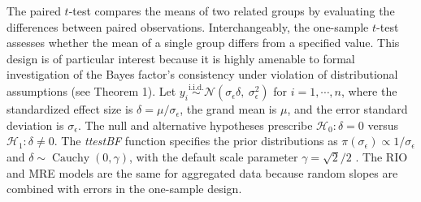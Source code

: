 \documentclass[preprint,12pt,authoryear]{elsarticle}
\begin{document}
The paired $t$-test compares the means of two related groups by evaluating the differences between paired observations. Interchangeably, the one-sample $t$-test assesses whether the mean of a single group differs from a specified value. This design is of particular interest because it is highly amenable to formal investigation of the Bayes factor's consistency under violation of distributional assumptions (see Theorem 1). Let $y_i\overset{\mathrm{i.i.d.}}{\sim}\mathcal{N}(\sigma_\epsilon\delta,\ \!\sigma_\epsilon^2)$ for $i=1,\dotsb,n$, where the standardized effect size is $\delta=\mu/\sigma_\epsilon$, the grand mean is $\mu$, and the error standard deviation is $\sigma_\epsilon$. The null and alternative hypotheses prescribe $\mathcal{H}_0:\delta=0$ versus $\mathcal{H}_1:\delta\neq0$. The \textit{ttestBF} function specifies the prior distributions as $\pi(\sigma_\epsilon)\propto1/\sigma_\epsilon$ and $\delta\sim\operatorname{Cauchy}(0,\gamma)$, with the default scale parameter $\gamma=\sqrt{2}/2$ \citetext{%
	\citealp[p.~24]{ly_harold_2016}; %
	\citealp[p.~237]{rouder_bayesian_2009}; %
	\citealp[p.~360]{rouder_default_2012}}.
The RIO and MRE models are the same for aggregated data because random slopes are combined with errors in the one-sample design.
\end{document}

